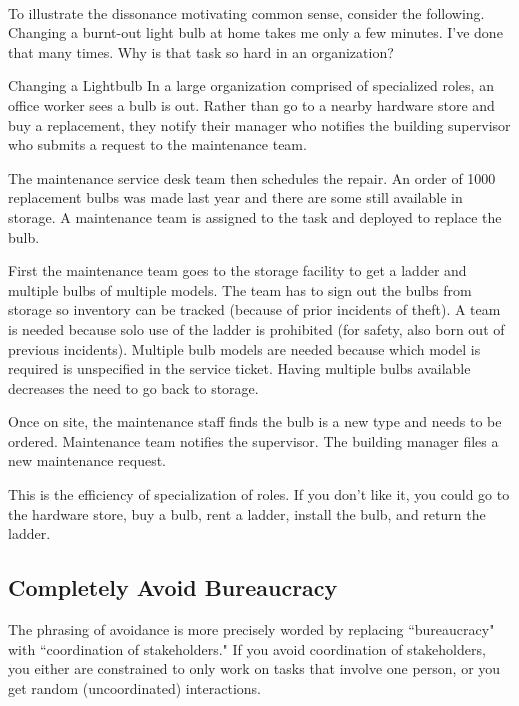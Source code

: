 \ \\

To illustrate the dissonance motivating common sense, consider the following. 
Changing a burnt-out light bulb at home takes me only a few minutes. I've done that many times. Why is that task so hard in an organization?

\begin{storytime}{Changing a Lightbulb}
In a large organization comprised of specialized roles, an office worker sees a bulb is out. Rather than go to a nearby hardware store and buy a replacement, they notify their manager who notifies the building supervisor who submits a request to the maintenance team. 

The maintenance service desk team then schedules the repair. An order of 1000 replacement bulbs was made last year and there are some still available in storage. A maintenance team is assigned to the task and deployed to replace the bulb. 

First the maintenance team goes to the storage facility to get a ladder and multiple bulbs of multiple models. The team has to sign out the bulbs from storage so inventory can be tracked (because of prior incidents of theft). A team is needed because solo use of the ladder is prohibited (for safety, also born out of previous incidents). Multiple bulb models are needed because which model is required is unspecified in the service ticket. Having multiple bulbs available decreases the need to go back to storage. 

Once on site, the maintenance staff finds the bulb is a new type and needs to be ordered. Maintenance team notifies the supervisor. The building manager files a new maintenance request.
\end{storytime}

This is the efficiency of specialization of roles. If you don't like it, you could go to the hardware store, buy a bulb, rent a ladder, install the bulb, and return the ladder.


\subsection*{Completely Avoid Bureaucracy}
The phrasing of avoidance is more precisely worded by replacing ``bureaucracy" with ``coordination of stakeholders." If you avoid coordination of stakeholders, you either are constrained to only work on tasks that involve one person, or you get random (uncoordinated) interactions. 

